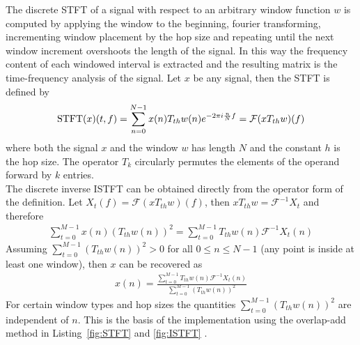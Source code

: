 \noindent The discrete STFT of a signal with respect to an arbitrary window function $w$ is computed by applying the window to the beginning, fourier transforming, incrementing window placement by the hop size and repeating until the next window increment overshoots the length of the signal. In this way the frequency content of each windowed interval is extracted and the resulting matrix is the time-frequency analysis of the signal. Let $x$ be any signal, then the STFT is defined by
\begin{align*}
\textnormal{STFT}(x)(t,f)=\sum^{N-1}_{n=0}x(n)T_{th} w(n)e^{-2\pi i \frac{n}{N} f} = \mathcal{F}(x T_{th} w)(f)
\end{align*}
where both the signal $x$ and the window $w$ has length $N$ and the constant $h$ is the hop size. The operator $T_k$ circularly permutes the elements of the operand forward by $k$ entries.\\

\noindent The discrete inverse ISTFT can be obtained directly from the operator form of the definition. 
 Let $X_t(f)=\mathcal{F}(x T_{th} w)(f)$, then $x T_{th} w = \mathcal{F}^{-1}X_{t}$ and therefore 
\begin{align*}
\sum^{M-1}_{t=0} x(n) (T_{th} w(n))^2 = \sum^{M-1}_{t=0} T_{th} w(n) \mathcal{F}^{-1}X_{t}(n) 
\end{align*}
Assuming $\sum^{M-1}_{t=0} (T_{th} w(n))^2 > 0$ for all $0\leq n \leq N-1$ (any point is inside at least one window), then $x$ can be recovered as
\begin{align*}
x(n) = \frac{\sum^{M-1}_{t=0} T_{th} w(n)\mathcal{F}^{-1}X_{t}(n)}{\sum^{M-1}_{t=0} (T_{th} w(n))^2}
\end{align*}
For certain window types and hop sizes the quantities $\sum^{M-1}_{t=0} (T_{th} w(n))^2$ are independent of $n$.
This is the basis of the implementation using the overlap-add method in
Listing~\ref{fig:STFT} and \ref{fig:ISTFT} .\\
